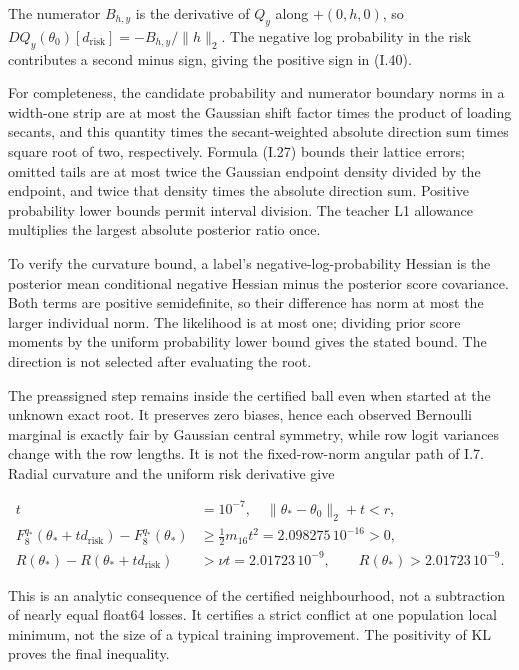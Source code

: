 \documentclass{article}
\begin{document}
The numerator \(B_{h,y}\) is the derivative of \(Q_y\) along
\(+(0,h,0)\), so \(DQ_y(\theta_0)[d_{\mathrm{risk}}]=-B_{h,y}/\|h\|_2\).
The negative log probability in the risk contributes a second minus
sign, giving the positive sign in (I.40).

For completeness, the candidate probability and numerator boundary norms
in a width-one strip are at most the Gaussian shift factor times the
product of loading secants, and this quantity times the secant-weighted
absolute direction sum times square root of two, respectively. Formula
(I.27) bounds their lattice errors; omitted tails are at most twice the
Gaussian endpoint density divided by the endpoint, and twice that
density times the absolute direction sum. Positive probability lower
bounds permit interval division. The teacher L1 allowance multiplies the
largest absolute posterior ratio once.

To verify the curvature bound, a label's negative-log-probability
Hessian is the posterior mean conditional negative Hessian minus the
posterior score covariance. Both terms are positive semidefinite, so
their difference has norm at most the larger individual norm. The
likelihood is at most one; dividing prior score moments by the uniform
probability lower bound gives the stated bound. The direction is not
selected after evaluating the root.

The preassigned step remains inside the certified ball even when started
at the unknown exact root. It preserves zero biases, hence each observed
Bernoulli marginal is exactly fair by Gaussian central symmetry, while
row logit variances change with the row lengths. It is not the
fixed-row-norm angular path of I.7. Radial curvature and the uniform
risk derivative give

\[
\begin{aligned}
t&=10^{-7},\quad \|\theta_*-\theta_0\|_2+t<r,\\
F_8^{q_*}(\theta_*+td_{\mathrm{risk}})-F_8^{q_*}(\theta_*)&\ge\tfrac12m_{16}t^2=2.098275\,10^{-16}>0,\\
R(\theta_*)-R(\theta_*+td_{\mathrm{risk}})&>\nu t=2.01723\,10^{-9},\qquad
R(\theta_*)>2.01723\,10^{-9}.
\end{aligned}
\tag{I.41}
\]

This is an analytic consequence of the certified neighbourhood, not a
subtraction of nearly equal float64 losses. It certifies a strict
conflict at one population local minimum, not the size of a typical
training improvement. The positivity of KL proves the final inequality.
\end{document}
